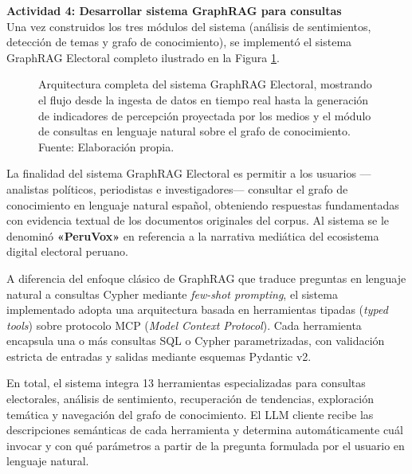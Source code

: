 \begin{landscape}
    \textbf{Actividad 4: Desarrollar sistema GraphRAG para consultas}
    \\
    Una vez construidos los tres módulos del sistema (análisis de sentimientos, detección
    de temas y grafo de conocimiento), se implementó el sistema GraphRAG Electoral
    completo ilustrado en la Figura \ref{6:fig4}.

\begin{figure}[!ht]
    \begin{center}
        \resizebox{0.85\textwidth}{!}{}
        \caption[Arquitectura completa del sistema GraphRAG Electoral]{Arquitectura completa del sistema GraphRAG Electoral, mostrando el flujo desde la ingesta de datos en tiempo real hasta la generación de indicadores de percepción proyectada por los medios y el módulo de consultas en lenguaje natural sobre el grafo de conocimiento.\\Fuente: Elaboración propia.}
        \label{6:fig4}
    \end{center}
\end{figure}
\end{landscape}

La finalidad del sistema GraphRAG Electoral es permitir a los usuarios —analistas
políticos, periodistas e investigadores— consultar el grafo de conocimiento en lenguaje
natural español, obteniendo respuestas fundamentadas con evidencia textual de los
documentos originales del corpus. Al sistema se le denominó \textbf{«PeruVox»} en
referencia a la narrativa mediática del ecosistema digital electoral peruano.

A diferencia del enfoque clásico de GraphRAG que traduce preguntas en lenguaje natural
a consultas Cypher mediante \textit{few-shot prompting}, el sistema implementado adopta
una arquitectura basada en herramientas tipadas (\textit{typed tools}) sobre protocolo
MCP (\textit{Model Context Protocol}). Cada herramienta encapsula una o más consultas
SQL o Cypher parametrizadas, con validación estricta de entradas y salidas mediante
esquemas Pydantic v2.

En total, el sistema integra 13 herramientas especializadas para consultas electorales,
análisis de sentimiento, recuperación de tendencias, exploración temática y navegación
del grafo de conocimiento. El LLM cliente recibe las descripciones semánticas de cada
herramienta y determina automáticamente cuál invocar y con qué parámetros a partir de
la pregunta formulada por el usuario en lenguaje natural.

